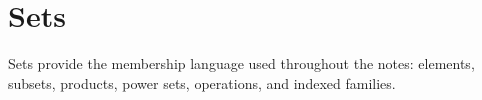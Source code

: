 \section{Sets}

Sets provide the membership language used throughout the notes: elements, subsets, products, power sets, operations, and indexed families.












